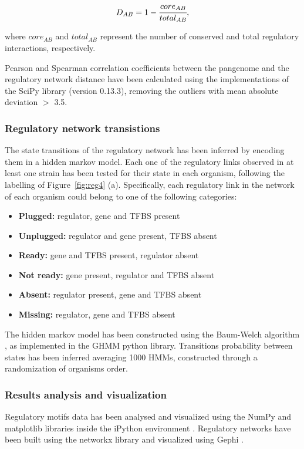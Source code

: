 \begin{equation}D_{AB} = 1 - \cfrac{core_{AB}}{total_{AB}},
\label{babu}
\end{equation}

where $core_{AB}$ and $total_{AB}$ represent the number of conserved and total regulatory interactions, respectively.

Pearson and Spearman correlation coefficients between the pangenome and the regulatory network distance have been calculated using the implementations of the SciPy library (version 0.13.3)\cite{jones2001scipy}, removing the outliers with mean absolute deviation $>$ 3.5.

\subsubsection{Regulatory network transistions}
The state transitions of the regulatory network has been inferred by encoding them in a hidden markov model. Each one of the regulatory links observed in at least one strain has been tested for their state in each organism, following the labelling of Figure~\ref{fig:reg4} (a). Specifically, each regulatory link in the network of each organism could belong to one of the following categories:

\begin{itemize}
\item \textbf{Plugged:} regulator, gene and TFBS present
\item \textbf{Unplugged:} regulator and gene present, TFBS absent
\item \textbf{Ready:} gene and TFBS present, regulator absent
\item \textbf{Not ready:} gene present, regulator and TFBS absent
\item \textbf{Absent:} regulator present, gene and TFBS absent
\item \textbf{Missing:} regulator, gene and TFBS absent
\end{itemize}

The hidden markov model has been constructed using the Baum-Welch algorithm \cite{jelinek1975design}, as implemented in the GHMM python library. Transitions probability between states has been inferred averaging 1000 HMMs, constructed through a randomization of organisms order. 

\subsubsection{Results analysis and visualization}
Regulatory motifs data has been analysed and visualized using the NumPy \cite{van2011numpy} and matplotlib \cite{hunter2007matplotlib} libraries inside the iPython environment \cite{perez2007ipython}. Regulatory networks have been built using the networkx library \cite{networkx} and visualized using Gephi \cite{bastian2009gephi}.

